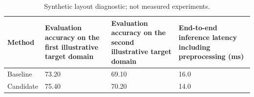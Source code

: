\begin{table}[t]
\centering
\caption{Synthetic layout diagnostic; not measured experiments.}
\label{tab:layout}
\begin{tabular}{@{}llll@{}}
\toprule
Method & Evaluation accuracy on the first illustrative target domain & Evaluation accuracy on the second illustrative target domain & End-to-end inference latency including preprocessing (ms) \\
\midrule
Baseline & 73.20 & 69.10 & 16.0 \\
Candidate & 75.40 & 70.20 & 14.0 \\
\bottomrule
\end{tabular}
\end{table}
